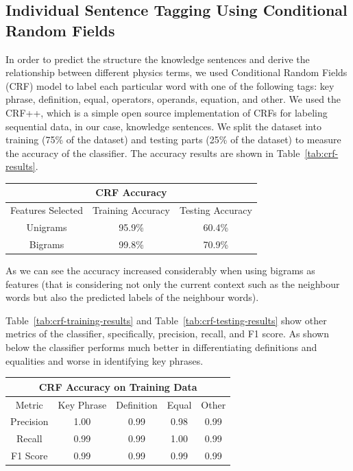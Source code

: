 \documentclass{article} %
\begin{document}
\vspace{2em}

\subsection{Individual Sentence Tagging Using Conditional Random Fields}

In order to predict the structure the knowledge sentences and derive the relationship between different physics terms, we used Conditional Random Fields (CRF) model to label each particular word with one of the following tags: key phrase, definition, equal, operators, operands, equation, and other. We used the CRF++, which is a simple open source implementation of CRFs for labeling sequential data, in our case, knowledge sentences. We split the dataset into training (75\% of the dataset) and testing parts (25\% of the dataset) to measure the accuracy of the classifier. The accuracy results are shown in Table~\ref{tab:crf-results}.

\begin{center}
 \label{tab:crf-results} 
\begin{tabular}{ |c||c|c| }
	\hline
	\multicolumn{3}{|c|}{CRF Accuracy} \\
	\hline
	Features Selected & Training Accuracy & Testing Accuracy \\
	\hline
	Unigrams & 95.9\% & 60.4\% \\
	Bigrams & 99.8\% & 70.9\% \\
	\hline
\end{tabular}
\end{center}

As we can see the accuracy increased considerably when using bigrams as features (that is considering not only the current context such as the neighbour words but also the predicted labels of the neighbour words).

Table~\ref{tab:crf-training-results} and Table~\ref{tab:crf-testing-results} show other metrics of the classifier, specifically, precision, recall, and F1 score. As shown below the classifier performs much better in differentiating definitions and equalities and worse in identifying key phrases.

\begin{center}
 \label{tab:crf-training-results} 
\begin{tabular}{ |c||c|c|c|c| }
	\hline
	\multicolumn{5}{|c|}{CRF Accuracy on Training Data} \\
	\hline
	Metric & Key Phrase & Definition & Equal & Other \\
	\hline
	Precision & 1.00 & 0.99 & 0.98 & 0.99 \\
	Recall & 0.99 & 0.99 & 1.00 & 0.99 \\
	F1 Score & 0.99 & 0.99 & 0.99 & 0.99 \\
	\hline
\end{tabular}
\end{center}
\end{document}
